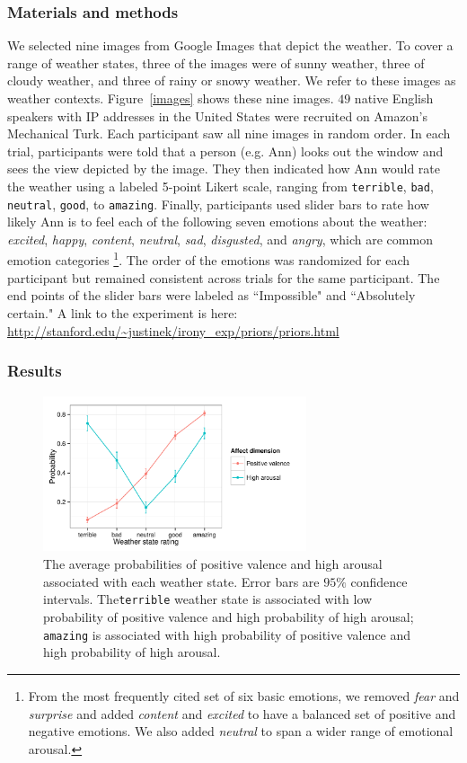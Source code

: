 \documentclass[10pt,letterpaper]{article}
\begin{document}
\subsubsection{Materials and methods}
We selected nine images from Google Images that depict the weather. To cover a range of weather states, three of the images were of sunny weather, three of cloudy weather, and three of rainy or snowy weather. We refer to these images as weather contexts. Figure~\ref{images} shows these nine images.
$49$ native English speakers with IP addresses in the United States were recruited on Amazon's Mechanical Turk. Each participant saw all nine images in random order. In each trial, participants were told that a person (e.g. Ann) looks out the window and sees the view depicted by the image. They then indicated how Ann would rate the weather using a labeled 5-point Likert scale, ranging from \texttt{terrible}, \texttt{bad}, \texttt{neutral}, \texttt{good}, to \texttt{amazing}. Finally, participants used slider bars to rate how likely Ann is to feel each of the following seven emotions about the weather: \emph{excited}, \emph{happy}, \emph{content}, \emph{neutral}, \emph{sad}, \emph{disgusted}, and \emph{angry}, which are common emotion categories \cite{ekman1992argument}\footnote{From the most frequently cited set of six basic emotions, we removed \emph{fear} and \emph{surprise} and added \emph{content} and \emph{excited} to have a balanced set of positive and negative emotions. We also added \emph{neutral} to span a wider range of emotional arousal.}.
The order of the emotions was randomized for each participant but remained consistent across trials for the same participant. The end points of the slider bars were labeled as ``Impossible" and ``Absolutely certain." A link to the experiment is here: \url{http://stanford.edu/~justinek/irony_exp/priors/priors.html}
  
 
\subsubsection{Results}
\begin{figure}
\includegraphics[width=220pt, height=130pt]{affect-prior.pdf}
\caption{The average probabilities of positive valence and high arousal associated with each weather state. Error bars are $95\%$ confidence intervals. The\texttt{terrible} weather state is associated with low probability of positive valence and high probability of high arousal; \texttt{amazing} is associated with high probability of positive valence and high probability of high arousal.}
\label{affect-prior}
\end{figure}
\end{document}
